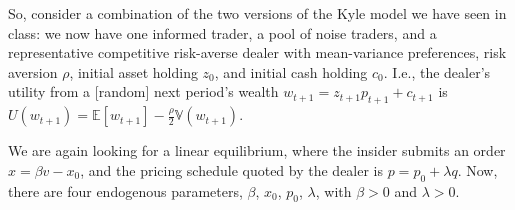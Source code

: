 \documentclass[11pt
, answers
]{exam}
\begin{document}
So, consider a combination of the two versions of the Kyle model we have seen in class: we now have one informed trader, a pool of noise traders, and a representative competitive risk-averse dealer with mean-variance preferences, risk aversion $\rho$, initial asset holding $z_{0}$, and initial cash holding $c_{0}$. I.e., the dealer's utility from a [random] next period's wealth $w_{t+1} = z_{t+1}p_{t+1} + c_{t+1}$ is $U(w_{t+1}) = \mathbb{E}[w_{t+1}] - \frac{\rho}{2} \mathbb{V}(w_{t+1})$.

We are again looking for a linear equilibrium, where the insider submits an order $x = \beta v - x_{0}$, and the pricing schedule quoted by the dealer is $p = p_{0}+\lambda q$. Now, there are four endogenous parameters, $\beta$, $x_{0}$, $p_{0}$, $\lambda$, with $\beta>0$ and $\lambda>0$.
\end{document}
